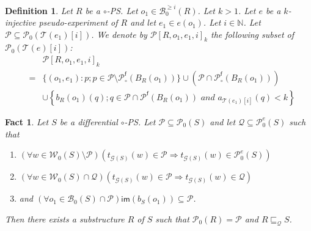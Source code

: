 \documentclass{article}
\newcommand{\target}[1]{t_{#1}}
\theoremstyle{plain}
\newtheorem{definition}{Definition}
\newtheorem{fact}[theorem]{Fact}
\newcommand{\Nat}{\ensuremath{\mathbb{N}}}
\newcommand{\taylor}[2]{\mathcal{T}(#1)[#2]}
\newcommand{\groundof}[1]{\mathcal{G}(#1)}
\newcommand{\im}[1]{\textsf{im}(#1)}
\newcommand{\portsatzero}[1]{\mathcal{P}_0(#1)}
\newcommand{\wiresatzero}[1]{\mathcal{W}_0(#1)}
\newcommand{\arity}[1]{{\textit{a}}_{#1}}
\newcommand{\conclusions}[1]{\mathcal{P}^{\textsf{f}}(#1)}
\newcommand{\exponentialportsatzero}[1]{\mathcal{P}_0^\textit{e}(#1)}
\newcommand{\conclusionscirc}[1]{\mathcal{P}_\circ^{\textsf{f}}(#1)}
\newcommand{\boxesatzero}[1]{\mathcal{B}_{0}(#1)}
\newcommand{\boxesatzerogeq}[2]{\mathcal{B}_0^{\geq #2}(#1)}
\begin{document}
\begin{definition}
Let $R$ be a $\circ$-PS. Let $o_1 \in \boxesatzerogeq{R}{i}$. Let $k > 1$. Let $e$ be a $k$-injective pseudo-experiment of $R$ and let $e_1 \in e(o_1)$. Let $i \in \Nat$. Let $\mathcal{P} \subseteq \portsatzero{\taylor{e_1}{i}}$. We denote by $\mathcal{P}[R, o_1, e_1, i]_k$ the following subset of $\portsatzero{\taylor{e}{i}}$: 
\begin{eqnarray*}
& & \mathcal{P}[R, o_1, e_1, i]_k \\
& = & \{ (o_1, e_1) : p ; p \in \mathcal{P} \setminus \conclusionscirc{B_R(o_1)} \} \cup (\mathcal{P} \cap \conclusionscirc{B_R(o_1)})\\
& & \cup \left\{ b_R(o_1)(q) ; q \in \mathcal{P} \cap \conclusions{B_R(o_1)} \textit{ and } \arity{\taylor{e_1}{i}}(q) < k \right\}
\end{eqnarray*}
\end{definition}



\begin{fact}\label{fact: adequate_extended}
Let $S$ be a differential $\circ$-PS. Let $\mathcal{P} \subseteq \portsatzero{S}$ and let $\mathcal{Q} \subseteq \exponentialportsatzero{S}$ such that
\begin{enumerate} 
\item $(\forall w \in \wiresatzero{S} \setminus \mathcal{P}) (\target{\groundof{S}}(w) \in \mathcal{P} \Rightarrow \target{\groundof{S}}(w) \in \exponentialportsatzero{S})$
\item $(\forall w \in \wiresatzero{S} \cap \mathcal{Q}) (\target{\groundof{S}}(w) \in \mathcal{P} \Rightarrow \target{\groundof{S}}(w) \in \mathcal{Q})$
\item and $(\forall o_1 \in \boxesatzero{S} \cap \mathcal{P}) \im{b_S(o_1)} \subseteq \mathcal{P}$.
\end{enumerate}
Then there exists a substructure $R$ of $S$ such that $\portsatzero{R} = \mathcal{P}$ and $R \sqsubseteq_\mathcal{Q} S$.
\end{fact}
\end{document}
